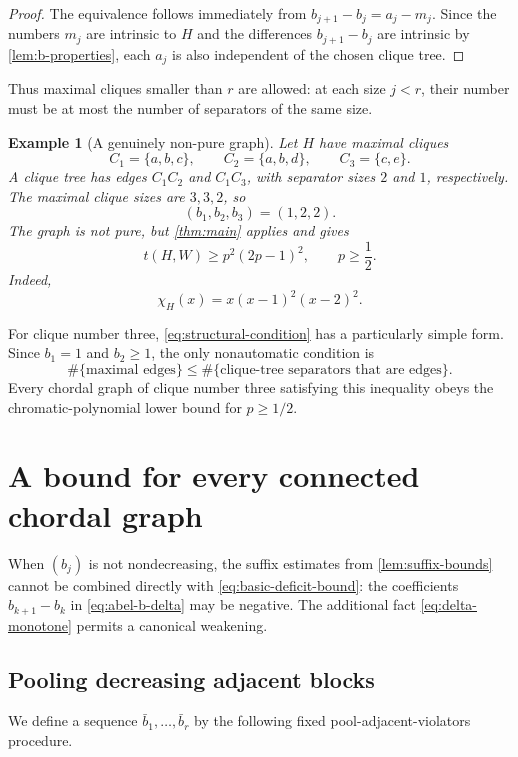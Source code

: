 \documentclass[11pt]{article}
\newtheorem{example}[example]{Example}
\numberwithin{equation}{section}
\begin{document}
\begin{proof}
The equivalence follows immediately from
$b_{j+1}-b_j=a_j-m_j$.  Since the numbers $m_j$ are intrinsic to $H$ and
the differences $b_{j+1}-b_j$ are intrinsic by
\cref{lem:b-properties}, each $a_j$ is also independent of the chosen
clique tree.
\end{proof}

Thus maximal cliques smaller than $r$ are allowed: at each size $j<r$,
their number must be at most the number of separators of the same size.

\begin{example}[A genuinely non-pure graph]\label{ex:nonpure}
Let $H$ have maximal cliques
\[
 C_1=\{a,b,c\},
 \qquad
 C_2=\{a,b,d\},
 \qquad
 C_3=\{c,e\}.
\]
A clique tree has edges $C_1C_2$ and $C_1C_3$, with separator sizes $2$
and $1$, respectively.  The maximal clique sizes are $3,3,2$, so
\[
 (b_1,b_2,b_3)=(1,2,2).
\]
The graph is not pure, but \cref{thm:main} applies and gives
\[
 t(H,W)\geq p^2(2p-1)^2,
 \qquad p\geq\frac12.
\]
Indeed,
\[
 \chi_H(x)=x(x-1)^2(x-2)^2.
\]
\end{example}

For clique number three, \eqref{eq:structural-condition} has a particularly
simple form.  Since $b_1=1$ and $b_2\geq1$, the only nonautomatic
condition is
\[
 \#\{\text{maximal edges}\}
 \leq
 \#\{\text{clique-tree separators that are edges}\}.
\]
Every chordal graph of clique number three satisfying this inequality
obeys the chromatic-polynomial lower bound for $p\geq1/2$.

\section{A bound for every connected chordal graph}
\label{sec:all-chordal}

When $(b_j)$ is not nondecreasing, the suffix estimates from
\cref{lem:suffix-bounds} cannot be combined directly with
\eqref{eq:basic-deficit-bound}: the coefficients
$b_{k+1}-b_k$ in \eqref{eq:abel-b-delta} may be negative.  The additional
fact \eqref{eq:delta-monotone} permits a canonical weakening.

\subsection{Pooling decreasing adjacent blocks}

We define a sequence $\bar b_1,\dots,\bar b_r$ by the following fixed
pool-adjacent-violators procedure.
\end{document}
